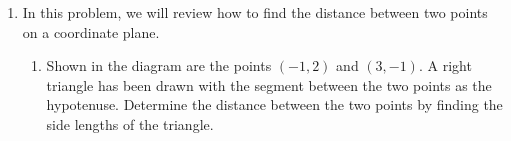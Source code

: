 \documentclass{article}
\begin{document}
\begin{enumerate}
\begin{enumerate}
    \item
    \begin{problem}
        $x^2y+4xy-1=0$
    \end{problem}
    \pspace{\vfill}

    \begin{solution}
    We want to isolate $y$.
    \begin{align*}
        x^2y+4xy-1&= 0 \\
        x^2y + 4xy &= 1 \\
        (x^2+4x)y &= 1 \\
        y &= \frac{1}{x^2+4x}
    \end{align*}
    Each value of $x$ corresponds to exactly one value of $y$, so $y$ is a function of $x$.
    \end{solution}

    \item 
    \begin{problem}
        $e^y - 2x = 1$
    \end{problem}
    \pspace{\vfill}

    \begin{solution}
        We can start by isolating $e^y$.
        \begin{align*}
            e^y &= 1+2x \\
            \intertext{Now we can take logs of both sides.}
            \ln(e^y) &= \ln(1+2x) \\
            y &= \ln(1+2x)
        \end{align*}
        Each value of $x$ corresponds to exactly one value of $y$, so $y$ is a function of $x$.
    \end{solution}

\end{enumerate}

\newpage

\item
\begin{problem}
In this problem, we will review how to find the distance between two points on a coordinate plane.
\end{problem}

\begin{enumerate}
    \item 
    \begin{problem}
    Shown in the diagram are the points $(-1, 2)$ and $(3, -1)$. A right triangle has been drawn with the segment between the two points as the hypotenuse. Determine the distance between the two points by finding the side lengths of the triangle.


\end{problem}
\end{enumerate}
\end{enumerate}
\end{document}
